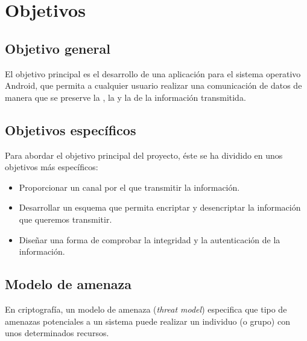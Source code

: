 
\chapter{Objetivos} %

\label{Chapter2}


\section{Objetivo general}

El objetivo principal es el desarrollo de una aplicación para el sistema operativo
Android, que permita a cualquier usuario realizar una comunicación de datos
de manera que se preserve la , la 
y la  de la información transmitida.


\section{Objetivos específicos}

Para abordar el objetivo principal del proyecto, éste se ha dividido en unos
objetivos más específicos:

\begin{itemize}
  \item Proporcionar un canal por el que transmitir la información.
  \item Desarrollar un esquema que permita encriptar y desencriptar la información que queremos transmitir.
  \item Diseñar una forma de comprobar la integridad y la autenticación de la información.
\end{itemize}


\section{Modelo de amenaza}

En criptografía, un modelo de amenaza (\emph{threat model}) especifica que tipo
de amenazas potenciales a un sistema puede realizar un individuo (o grupo) con
unos determinados recursos.

